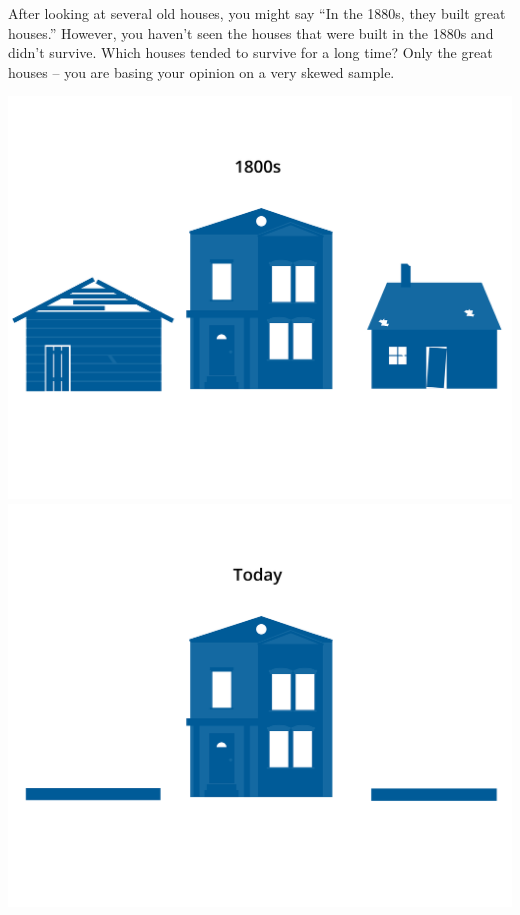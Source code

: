 After looking at several old houses, you might say ``In the 1880s,
they built great houses.'' However, you haven't seen the houses that
were built in the 1880s and didn't survive. Which houses tended to
survive for a long time? Only the great houses -- you are
basing your opinion on a very skewed sample.

\includegraphics[width=.5\textwidth]{survivorshipBias.png}
\includegraphics[width=.5\textwidth]{survivorshipBias2.png}


